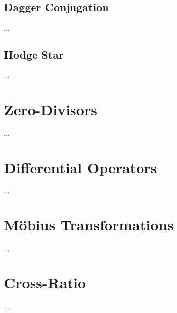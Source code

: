 \subsection{Dagger Conjugation}
...
\subsection{Hodge Star}
...
\section{Zero-Divisors}
...
\section{Differential Operators}
...
\section{M\"{o}bius Transformations}
...
\section{Cross-Ratio}
...